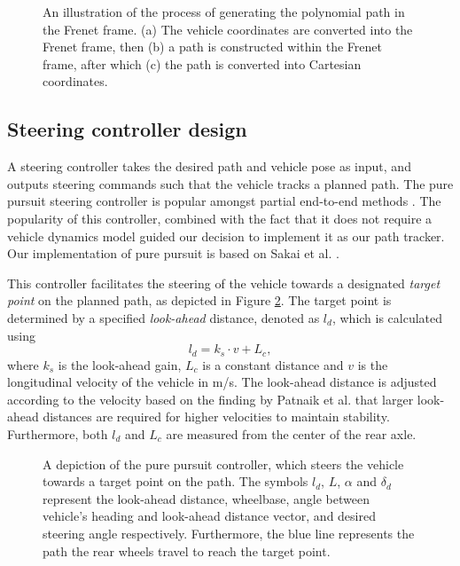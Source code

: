 \begin{figure}[htb!]
    \centering
    
    \caption[Generating the path in the Frenet frame]{An illustration of the process of generating the polynomial path in the Frenet frame. (a) The vehicle coordinates are converted into the Frenet frame, then (b) a path is constructed within the Frenet frame, after which (c) the path is converted into Cartesian coordinates.}
    \label{fig:polynomial_path_generation}
\end{figure}


\subsection{Steering controller design}

A steering controller takes the desired path and vehicle pose as input, and outputs steering commands such that the vehicle tracks a planned path. 
The pure pursuit steering controller is popular amongst partial end-to-end methods \cite{Evans2021b, Weiss2020}.
The popularity of this controller, combined with the fact that it does not require a vehicle dynamics model guided our decision to implement it as our path tracker.
Our implementation of pure pursuit is based on Sakai et al. \cite{Sakai2018}.


This controller facilitates the steering of the vehicle towards a designated \emph{target point} on the planned path, as depicted in Figure \ref{fig:pure_pursuit}. 
The target point is determined by a specified \emph{look-ahead} distance, denoted as $l_d$, which is calculated using
\begin{equation}\label{eq:l_d}
    l_d = k_s \cdot v + L_{c},
\end{equation}
where $k_s$ is the look-ahead gain, $L_{c}$ is a constant distance and $v$ is the longitudinal velocity of the vehicle in m/s. 
The look-ahead distance is adjusted according to the velocity based on the finding by Patnaik et al. \cite{Patnaik2020} that larger look-ahead distances are required for higher velocities to maintain stability.
Furthermore, both $l_d$ and $L_c$ are measured from the center of the rear axle.

\begin{figure}[htb!]
    \centering
    
    \caption[A depiction of the pure pursuit controller]{A depiction of the pure pursuit controller, which steers the vehicle towards a target point on the path. The symbols $l_d$, $L$, $\alpha$ and $\delta_{d}$ represent the look-ahead distance, wheelbase, angle between vehicle's heading and look-ahead distance vector, and desired steering angle respectively. Furthermore, the blue line represents the path the rear wheels travel to reach the target point.}
    \label{fig:pure_pursuit}
\end{figure}

